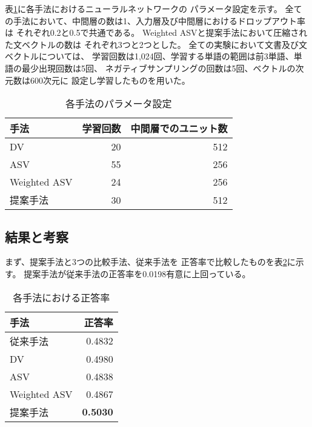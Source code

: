 
表\ref{tab:ParametersOfMethods}に各手法におけるニューラルネットワークの
パラメータ設定を示す。
全ての手法において、中間層の数は1、入力層及び中間層におけるドロップアウト率は
それぞれ0.2と0.5で共通である。
Weighted ASVと提案手法において圧縮された文ベクトルの数は
それぞれ3つと2つとした。
全ての実験において文書及び文ベクトルについては、
学習回数は1,024回、学習する単語の範囲は前3単語、単語の最少出現回数は5回、
ネガティブサンプリングの回数は5回、ベクトルの次元数は600次元に
設定し学習したものを用いた。

\begin{table}[b!]
  \caption{各手法のパラメータ設定}
  \centering
  \begin{tabular}{l | r r} \label{tab:ParametersOfMethods}
    手法 & 学習回数 & 中間層でのユニット数 \\
    \hline
    DV & 20 & 512 \\
    ASV & 55 & 256 \\
    Weighted ASV & 24 & 256 \\
    提案手法 & 30 & 512 \\
  \end{tabular}
\end{table}


\subsection{結果と考察}

まず、提案手法と3つの比較手法、従来手法\cite{fujitani15}を
正答率で比較したものを表\ref{tab:Accuracies}に示す。
提案手法が従来手法\cite{fujitani15}の正答率を0.0198有意に上回っている。

\begin{table}[b!]
  \caption{各手法における正答率}
  \centering
  \begin{tabular}{l | r} \label{tab:Accuracies}
    手法 & 正答率 \\
    \hline
    従来手法\cite{fujitani15} & 0.4832 \\
    DV & 0.4980 \\
    ASV & 0.4838 \\
    Weighted ASV & 0.4867 \\
    提案手法 & \textbf{0.5030} \\
  \end{tabular}
\end{table}

